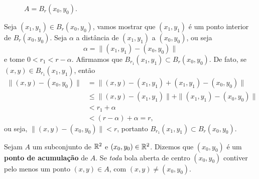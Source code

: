 \begin{example}
\begin{figure}[htbp]
        \caption{\(A = B_r(x_0,y_0).\)}
        \label{fig:bolaaberta1}
        \end{figure}
    Seja \((x_1,y_1)\in B_r(x_0,y_0)\), vamos mostrar que \((x_1,y_1)\) é um ponto interior de \(B_r(x_0,y_0)\). Seja \(\alpha\) a distância de \((x_1,y_1)\) a \((x_0,y_0)\), ou seja \[\alpha = \|(x_1,y_1) - (x_0,y_0)\|\] e tome \(0 < r_1 < r-\alpha\). Afirmamos que \(B_{r_1}(x_1,y_1) \subset B_r(x_0,y_0)\). De fato, se \((x,y)\in B_{r_1}(x_1,y_1)\), então
            \begin{align*}
                \|(x,y) - (x_0,y_0)\|
                    & = \|(x,y) - (x_1,y_1) + (x_1,y_1) - (x_0,y_0)\| \\
                    & \leq \|(x,y) - (x_1,y_1)\| + \|(x_1,y_1) - (x_0,y_0)\| \\
                    & < r_1 + \alpha \\
                    & < (r-\alpha) + \alpha = r,
            \end{align*}
        ou seja, \(\|(x,y) - (x_0,y_0)\| < r\), portanto \(B_{r_1}(x_1,y_1) \subset B_r(x_0,y_0)\).
\end{example}

\begin{definition}
    Sejam \(A\) um subconjunto de \(\mathbb{R}^2\) e \((x_0,y_0)\in\mathbb{R}^2\). Dizemos que \((x_0,y_0)\) é um \textbf{ponto de acumulação} de \(A\). Se \textit{toda} bola aberta de centro \((x_0,y_0)\) contiver pelo menos um ponto \((x,y)\in A\), com \((x,y)\neq(x_0,y_0)\).
\end{definition}

